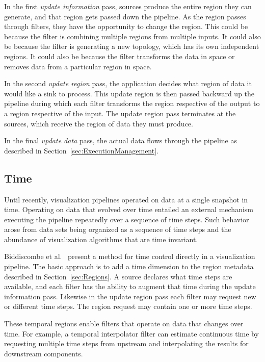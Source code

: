 \documentclass{article}
\newcommand*{\scite}[1]{~\cite{#1}}
\newcommand*{\keyterm}[1]{\emph{#1}}
\newcommand{\etal}{et al.}
\begin{document}
In the first \keyterm{update information} pass, sources produce the entire
region they can generate, and that region gets passed down the pipeline.
As the region passes through filters, they have the opportunity to change
the region.  This could be because the filter is combining multiple regions
from multiple inputs.  It could also be because the filter is generating a
new topology, which has its own independent regions.  It could also be
because the filter transforms the data in space or removes data from a
particular region in space.

In the second \keyterm{update region} pass, the application decides what
region of data it would like a sink to process.  This update region is then
passed backward up the pipeline during which each filter transforms the
region respective of the output to a region respective of the input.  The
update region pass terminates at the sources, which receive the region of
data they must produce.

In the final \keyterm{update data} pass, the actual data flows through the
pipeline as described in Section~\ref{sec:ExecutionManagement}.

\subsection{Time}
\label{sec:Time}

Until recently, visualization pipelines operated on data at a single
snapshot in time.  Operating on data that evolved over time entailed an
external mechanism executing the pipeline repeatedly over a sequence of
time steps.  Such behavior arose from data sets being organized as a
sequence of time steps and the abundance of visualization algorithms that
are time invariant.

Biddiscombe \etal\scite{Biddiscombe2007} present a method for time control
directly in a visualization pipeline.  The basic approach is to add a time
dimension to the region metadata described in Section~\ref{sec:Regions}.  A
source declares what time steps are available, and each filter has the
ability to augment that time during the update information pass.  Likewise
in the update region pass each filter may request new or different time
steps.  The region request may contain one or more time steps.

These temporal regions enable filters that operate on data that changes
over time.  For example, a temporal interpolator filter can estimate
continuous time by requesting multiple time steps from upstream and
interpolating the results for downstream components.
\end{document}
